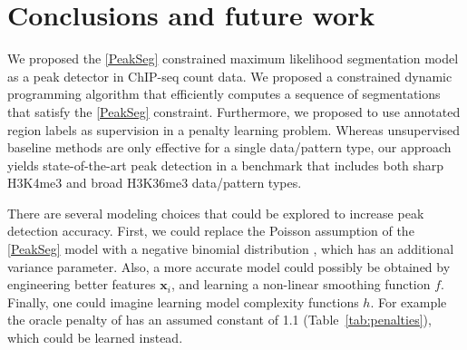 \documentclass{article}
\begin{document}


\section{Conclusions and future work}
\label{sec:conclusions}

We proposed the \ref{PeakSeg} constrained maximum likelihood
segmentation model as a peak detector in ChIP-seq count data. We
proposed a constrained dynamic programming algorithm that efficiently
computes a sequence of segmentations that satisfy the \ref{PeakSeg}
constraint. Furthermore, we proposed to use annotated region labels as
supervision in a penalty learning problem. Whereas unsupervised
baseline methods are only effective for a single data/pattern type, our
approach yields state-of-the-art peak detection in a benchmark that
includes both sharp H3K4me3 and broad H3K36me3 data/pattern types.

There are several modeling choices that could be explored to increase
peak detection accuracy. First, we could replace the Poisson
assumption of the \ref{PeakSeg} model with a negative binomial
distribution \citep{cleynen2013segmentation}, which has an additional
variance parameter. Also, a more accurate model could possibly be
obtained by engineering better features $\mathbf x_i$, and learning a
non-linear smoothing function $f$. Finally, one could imagine 
learning model complexity functions $h$. For example the oracle
penalty of \citet{cleynen2013segmentation} has an assumed constant of
1.1 (Table~\ref{tab:penalties}), which could be learned instead.
\end{document}
